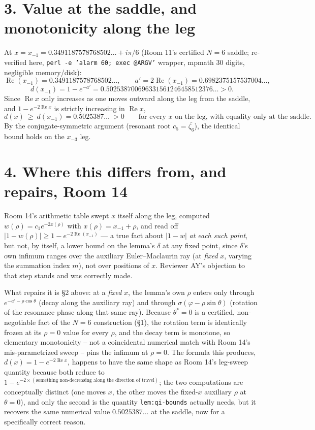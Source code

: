 \documentclass[11pt]{article}
\begin{document}
\section*{3. Value at the saddle, and monotonicity along the leg}

At $x=x_{-1}=0.3491187578768502\ldots+i\pi/6$ (Room 11's certified $N=6$ saddle; re-verified here,
\texttt{perl -e 'alarm 60; exec @ARGV'} wrapper, mpmath 30 digits, negligible memory/disk):
\[
\operatorname{Re}(x_{-1})=0.3491187578768502\ldots,\qquad a'=2\operatorname{Re}(x_{-1})=0.6982375157537004\ldots,
\]
\[
\boxed{d(x_{-1})=1-e^{-a'}=0.502538700696331561246458512376\ldots>0.}
\]
Since $\operatorname{Re}x$ only increases as one moves outward along the leg from the saddle, and
$1-e^{-2\operatorname{Re}x}$ is strictly increasing in $\operatorname{Re}x$,
\[
d(x)\ \ge\ d(x_{-1})=0.5025387\ldots\ >0\qquad\text{for every }x\text{ on the leg, with equality only at the saddle.}
\]
By the conjugate-symmetric argument (resonant root $c_5=\overline{\zeta_6}$), the identical bound
holds on the $x_{-3}$ leg.

\section*{4. Where this differs from, and repairs, Room 14}

Room 14's arithmetic table swept $x$ itself along the leg, computed $w(\rho)=c_1e^{-2x(\rho)}$ with
$x(\rho)=x_{-1}+\rho$, and read off $|1-w(\rho)|\ge1-e^{-2\operatorname{Re}(x_{-1})}$ --- a true fact
about $|1-w|$ \emph{at each such point}, but not, by itself, a lower bound on the lemma's $\delta$
at any fixed point, since $\delta$'s own infimum ranges over the auxiliary Euler--Maclaurin ray (at
\emph{fixed} $x$, varying the summation index $m$), not over positions of $x$. Reviewer AY's
objection to that step stands and was correctly made.

What repairs it is \S2 above: at a \emph{fixed} $x$, the lemma's own $\rho$ enters only through
$e^{-a'-\rho\cos\theta}$ (decay along the auxiliary ray) and through $\sigma(\varphi-\rho\sin\theta)$
(rotation of the resonance phase along that same ray). Because $\theta^\ast=0$ is a certified,
non-negotiable fact of the $N=6$ construction (\S1), the rotation term is identically frozen at its
$\rho=0$ value for every $\rho$, and the decay term is monotone, so elementary monotonicity --
not a coincidental numerical match with Room 14's mis-parametrized sweep -- pins the infimum at
$\rho=0$. The formula this produces, $d(x)=1-e^{-2\operatorname{Re}x}$, happens to have the same
shape as Room 14's leg-sweep quantity because both reduce to $1-e^{-2\times(\text{something
non-decreasing along the direction of travel})}$; the two computations are conceptually distinct
(one moves $x$, the other moves the fixed-$x$ auxiliary $\rho$ at $\theta=0$), and only the second
is the quantity \texttt{lem:qi-bounds} actually needs, but it recovers the same numerical value
$0.5025387\ldots$ at the saddle, now for a specifically correct reason.
\end{document}
